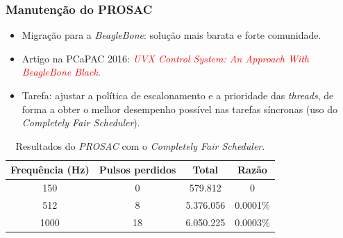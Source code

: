 \begin{frame}
\frametitle {Manutenção do PROSAC}

\begin{itemize}
  \item Migração para a \textit{BeagleBone}: solução mais barata e forte
  comunidade.
  \item Artigo na PCaPAC 2016: \textcolor{red}{\textit{UVX Control System: An
  Approach With BeagleBone Black}}.
  \item Tarefa: ajustar a política de escalonamento e a prioridade das
  \textit{threads}, de forma a obter o melhor desempenho possível nas tarefas
  síncronas (uso do \textit{Completely Fair Scheduler}).
\end{itemize}

\vspace{-12pt}
\begin{table}[h]

	\centering
	\caption{\label{tab:prosac} Resultados do \textit{PROSAC} com o
	\textit{Completely Fair Scheduler}.}
	\begin{tabular}{| c | c | c | c |}
		\hline
		\textbf{Frequência (Hz)} & \textbf{Pulsos perdidos} & \textbf{Total} &
		\textbf{Razão} \\ \hline 
		150 & 0 & 579.812  & 0 \\ \hline
		512 & 8 & 5.376.056 & 0.0001\% \\ \hline
		1000 & 18 & 6.050.225 & 0.0003\% \\ \hline
	\end{tabular}	    
\end{table}

\end{frame}


